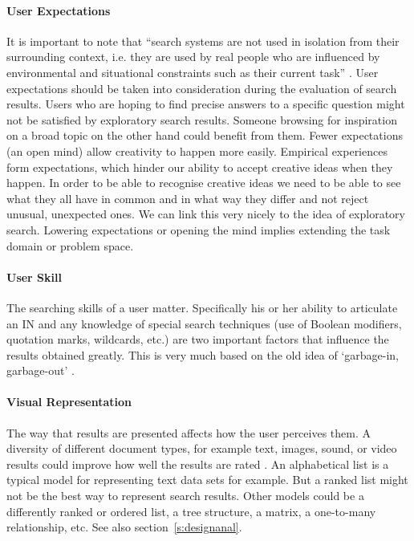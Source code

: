 \paragraph{User Expectations} It is important to note that ``search systems are not used in isolation from their surrounding context, i.e. they are used by real people who are influenced by environmental and situational constraints such as their current task'' \autocite{White2004}. User expectations should be taken into consideration during the evaluation of search results. Users who are hoping to find precise answers to a specific question might not be satisfied by exploratory search results. Someone browsing for inspiration on a broad topic on the other hand could benefit from them. Fewer expectations (an open mind) allow creativity to happen more easily. Empirical experiences form expectations, which hinder our ability to accept creative ideas when they happen. In order to be able to recognise creative ideas we need to be able to see what they all have in common and in what way they differ and not reject unusual, unexpected ones. We can link this very nicely to the idea of exploratory search. Lowering expectations or opening the mind implies extending the task domain or problem space. 

\paragraph{User Skill} The searching skills of a user matter. Specifically his or her ability to articulate an \acf{IN} and any knowledge of special search techniques (use of Boolean modifiers, quotation marks, wildcards, etc.) are two important factors that influence the results obtained greatly. This is very much based on the old idea of `garbage-in, garbage-out' \autocite{Lidwell2010}.

\paragraph{Visual Representation} The way that results are presented affects how the user perceives them. A diversity of different document types, for example text, images, sound, or video results could improve how well the results are rated \autocite{Sawle2011}. An alphabetical list is a typical model for representing text data sets for example. But a ranked list might not be the best way to represent search results. Other models could be a differently ranked or ordered list, a tree structure, a matrix, a one-to-many relationship, etc. See also section~\ref{s:designanal}.

